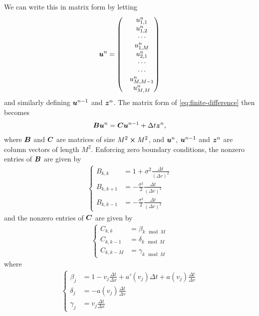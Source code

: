 We can write this in matrix form by letting 
%
\begin{align} 
    \boldsymbol{u}^n = 
    \begin{pmatrix}
        &u^n_{1,1}\\
        & u^n_{1,2}\\
        & \cdots \\
        &u^n_{1,M}\\
        &u^n_{2,1}\\
        & \cdots \\ 
        & \cdots \\ 
        &u^n_{M,M-1}\\
        &u^n_{M,M} 
    \end{pmatrix}
\end{align}
%
and similarly defining $\boldsymbol{u}^{n-1}$ and $\boldsymbol{z}^n$. The matrix form of \autoref{eq:finite-difference} then becomes 
%
\begin{align} 
    \label{eq:fd-matrix}
    \boldsymbol{B} \boldsymbol{u}^n = \boldsymbol{C} \boldsymbol{u}^{n-1} + \Delta t \boldsymbol{z}^n,
\end{align}
%
where $\boldsymbol{B}$ and $\boldsymbol{C}$ are matrices of size $M^2 \cross M^2$, and $\boldsymbol{u}^n$, $\boldsymbol{u}^{n-1}$ and $\boldsymbol{z}^n$ are column vectors of length $M^2$. Enforcing zero boundary conditions, the nonzero entries of $\boldsymbol{B}$ are given by
%
\begin{align} 
    \begin{cases} 
        B_{k,k} &= 1 + \sigma^2 \frac{\Delta t}{(\Delta v)^2}\\
        B_{k,k+1} &= - \frac{\sigma^2}{2} \frac{\Delta t}{(\Delta v)^2}\\ 
        B_{k,k-1} &= - \frac{\sigma^2}{2} \frac{\Delta t}{(\Delta v)^2}
    \end{cases}
\end{align}
%
and the nonzero entries of $\boldsymbol{C}$ are given by 
%
\begin{align} 
    \begin{cases}
        C_{k,k} &= \beta_{k \mod M}\\
        C_{k,k-1} &= \delta_{k \mod M}\\
        C_{k,k-M} &= \gamma_{k \mod M}
    \end{cases}
\end{align}
%
where 
%
\begin{align} 
    \begin{cases} 
        \beta_j &= 1 - v_j \frac{\Delta t}{\Delta x} + a'(v_j)\Delta t + a(v_j)\frac{\Delta t}{\Delta v}\\
        \delta_j &= - a(v_j)\frac{\Delta t}{\Delta v}\\
        \gamma_j &= v_j \frac{\Delta t}{\Delta x}
    \end{cases}
\end{align}
%

